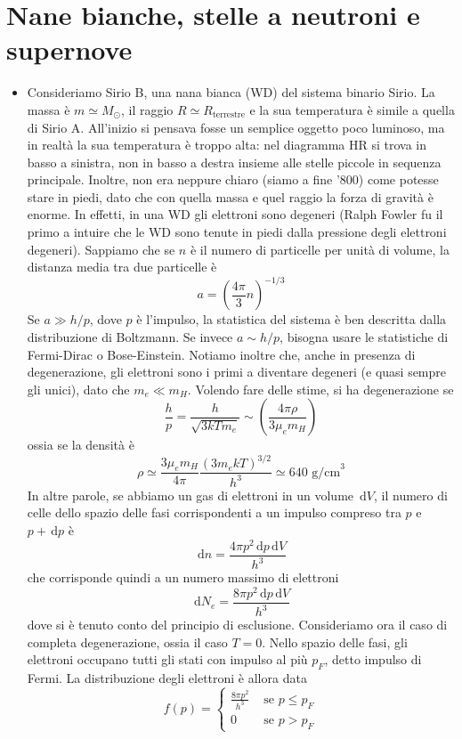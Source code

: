 \documentclass[a4paper,11pt]{article}
\renewcommand{\d}{\mathrm{d}} %
\newcommand{\s}{_\odot}
\renewcommand{\d}{\,\mathrm{d}}
\theoremstyle{theorem}
\theoremstyle{definition}
\begin{document}
	\section{Nane bianche, stelle a neutroni e supernove}
	\begin{itemize}
		\item Consideriamo Sirio B, una nana bianca (WD) del sistema binario Sirio. La massa è $m\simeq M\s$, il raggio $R\simeq R_\textrm{terrestre}$ e la sua temperatura è simile a quella di Sirio A. All'inizio si pensava fosse un semplice oggetto poco luminoso, ma in realtà la sua temperatura è troppo alta: nel diagramma HR si trova in basso a sinistra, non in basso a destra insieme alle stelle piccole in sequenza principale. Inoltre, non era neppure chiaro (siamo a fine '800) come potesse stare in piedi, dato che con quella massa e quel raggio la forza di gravità è enorme. In effetti, in una WD gli elettroni sono degeneri (Ralph Fowler fu il primo a intuire che le WD sono tenute in piedi dalla pressione degli elettroni degeneri). Sappiamo che se $n$ è il numero di particelle per unità di volume, la distanza media tra due particelle è
		\[a=\left(\frac{4\pi}{3}n\right)^{-1/3}\]
		Se $a\gg h/p$, dove $p$ è l'impulso, la statistica del sistema è ben descritta dalla distribuzione di Boltzmann. Se invece $a\sim h/p$, bisogna usare le statistiche di Fermi-Dirac o Bose-Einstein. Notiamo inoltre che, anche in presenza di degenerazione, gli elettroni sono i primi a diventare degeneri (e quasi sempre gli unici), dato che $m_e\ll m_H$. Volendo fare delle stime, si ha degenerazione se
		\[\frac{h}{p}=\frac{h}{\sqrt{3kTm_e}}\sim\left(\frac{4\pi\rho}{3\mu_e m_H}\right)\]
		ossia se la densità è
		\[\rho\simeq\frac{3\mu_em_H}{4\pi}\frac{(3m_ekT)^{3/2}}{h^3}\simeq 640\textrm{ g/cm}^3\]
		In altre parole, se abbiamo un gas di elettroni in un volume $\d V$, il numero di celle dello spazio delle fasi corrispondenti a un impulso compreso tra $p$ e $p+\d p$ è
		\[\d n=\frac{4\pi p^2\d p \d V}{h^3}\]
		che corrisponde quindi a un numero massimo di elettroni
		\[\d N_e=\frac{8\pi p^2\d p \d V}{h^3}\]
		dove si è tenuto conto del principio di esclusione. Consideriamo ora il caso di completa degenerazione, ossia il caso $T=0$. Nello spazio delle fasi, gli elettroni occupano tutti gli stati con impulso al più $p_F$, detto impulso di Fermi. La distribuzione degli elettroni è allora data
		\[f(p)=\begin{cases}
		\frac{8\pi p^2}{h^3}&\textrm{ se }p\leq p_F\\0&\textrm{ se }p>p_F
		\end{cases}\] 

\end{itemize}
\end{document}
